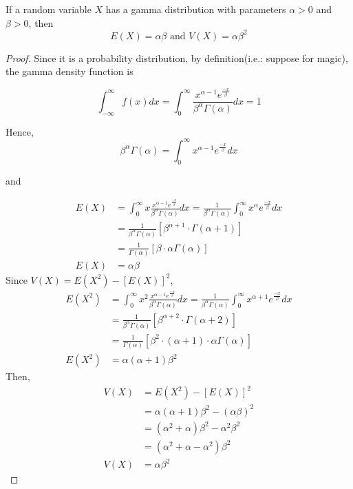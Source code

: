 \begin{theorem}
    If a random variable $X$ has a gamma distribution with parameters $\alpha > 0$  and $\beta > 0$, then
    \[
    E(X) = \alpha\beta \text{ and } V(X) = \alpha\beta^2
    \]
\end{theorem}

\begin{proof}
    Since it is a probability distribution, by definition(i.e.: suppose for magic), the gamma density function is

    \[
        \int^\infty_{-\infty} f(x) dx 
        = \int^\infty_0 \frac{x^{\alpha - 1}e^{\frac{-x}{\beta}}}{\beta^\alpha\Gamma(\alpha)} dx = 1
    \]

    Hence,
    \[
        \beta^\alpha\Gamma(\alpha) 
        = 
        \int^\infty_0 x^{\alpha - 1}e^{\frac{-x}{\beta}} dx
    \]

    and

    \begin{align*}
        E(X) &= \int^\infty_0 x\frac{x^{\alpha - 1}e^{\frac{-x}{\beta}}}{\beta^\alpha\Gamma(\alpha)} dx 
        = \frac{1}{\beta^\alpha\Gamma(\alpha)} \int^\infty_0 x^\alpha e^{\frac{-x}{\beta}} dx \\
        &= \frac{1}{\beta^\alpha\Gamma(\alpha)} \left[\beta^{\alpha + 1} \cdot \Gamma(\alpha + 1)\right] \\
        &= \frac{1}{\Gamma(\alpha)} \left[\beta \cdot \alpha \Gamma(\alpha)\right] \\
        E(X) &= \alpha\beta
    \end{align*}
    Since $V(X) = E(X^2) - [E(X)]^2$,
    \begin{align*}
        E(X^2) &= \int^\infty_0 x^2\frac{x^{\alpha - 1}e^{\frac{-x}{\beta}}}{\beta^\alpha\Gamma(\alpha)} dx 
        = \frac{1}{\beta^\alpha\Gamma(\alpha)} \int^\infty_0 x^{\alpha + 1} e^{\frac{-x}{\beta}} dx \\
        &= \frac{1}{\beta^\alpha\Gamma(\alpha)} \left[\beta^{\alpha + 2} \cdot \Gamma(\alpha + 2)\right] \\
        &= \frac{1}{\Gamma(\alpha)} \left[\beta^2 \cdot (\alpha + 1)\cdot \alpha \Gamma(\alpha)\right] \\
        E(X^2) &= \alpha(\alpha+1)\beta^2
    \end{align*}
    Then,
    \begin{align*}
        V(X) &= E(X^2) - [E(X)]^2 \\
        &= \alpha(\alpha+1)\beta^2 - (\alpha\beta)^2 \\
        &= (\alpha^2 + \alpha)\beta^2 - \alpha^2\beta^2 \\
        &= (\alpha^2 + \alpha -  \alpha^2)\beta^2 \\
        V(X) &= \alpha\beta^2
    \end{align*}
\end{proof}
